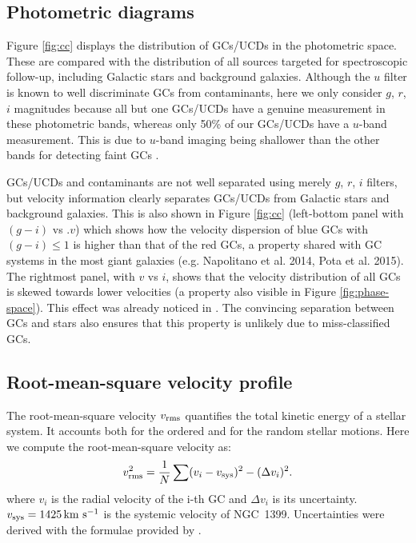 \documentclass[useAMS,usenatbib]{mn2e}
\newcommand{\kms}{\mbox{\,km~s$^{-1}$}}
\begin{document}
\subsection{Photometric diagrams}


Figure \ref{fig:cc} displays the distribution of GCs/UCDs in the photometric 
space. These are compared with the distribution of all sources targeted for 
spectroscopic follow-up, including Galactic stars and background galaxies. 
Although the $u$ filter is known to well discriminate GCs from contaminants, 
here we only consider $g$, $r$, $i$ magnitudes because all but one GCs/UCDs 
have a genuine measurement in these photometric bands, whereas only 50\% of our 
GCs/UCDs have a $u$-band measurement. This is due to $u$-band imaging being 
shallower than the other bands for detecting faint GCs \citep{DAbrusco16}.

GCs/UCDs and contaminants are not well separated using merely $g$, $r$, $i$ 
filters, but velocity information clearly separates GCs/UCDs from Galactic 
stars and background galaxies. This is also shown in Figure \ref{fig:cc} 
(left-bottom panel with $(g-i)$ vs .$v$) which shows how the velocity 
dispersion of blue GCs with $(g-i) \le 1$ is higher than that of the red GCs, a 
property shared with GC systems in the most giant galaxies (e.g. Napolitano et 
al. 2014, Pota et al. 2015). The rightmost panel, with $v$ vs $i$, shows that 
the velocity distribution of all GCs is skewed towards lower velocities (a 
property also visible in Figure \ref{fig:phase-space}). This effect was already 
noticed in \citet{Schuberth}. The convincing separation between GCs and stars 
also ensures that this property is unlikely due to miss-classified GCs. 

\subsection{Root-mean-square velocity profile}
The root-mean-square velocity $v_{\rm rms}$ quantifies the total kinetic energy 
of a stellar system. It accounts both for the ordered and for the random 
stellar motions. Here we compute the root-mean-square velocity as:
\begin{equation}
v_{\rm rms}^2 = \frac{1}{N}  \sum (v_i - v_{\rm sys})^2 - (\Delta v_i)^2 .
\label{eq:sigma}
\end{equation}
where $v_i$ is the radial velocity of the i-th GC and $\Delta v_i$ is its 
uncertainty. $v_{\rm sys}=1425 \kms$ is the systemic velocity of NGC~1399. 
Uncertainties were derived with the formulae provided by \citet{Danese}. 
\end{document}
